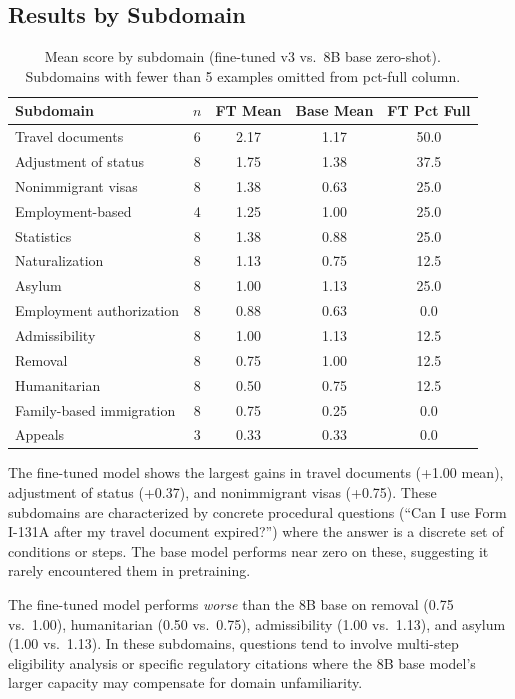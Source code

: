 \documentclass[11pt]{article}
\begin{document}
\subsection{Results by Subdomain}

\begin{table}[ht]
  \centering
  \caption{Mean score by subdomain (fine-tuned v3 vs.\ 8B base zero-shot). Subdomains with fewer than 5 examples omitted from pct-full column.}
  \label{tab:subdomain}
  \begin{tabular}{lcccc}
    \toprule
    Subdomain & $n$ & FT Mean & Base Mean & FT Pct Full \\
    \midrule
    Travel documents & 6 & 2.17 & 1.17 & 50.0 \\
    Adjustment of status & 8 & 1.75 & 1.38 & 37.5 \\
    Nonimmigrant visas & 8 & 1.38 & 0.63 & 25.0 \\
    Employment-based & 4 & 1.25 & 1.00 & 25.0 \\
    Statistics & 8 & 1.38 & 0.88 & 25.0 \\
    Naturalization & 8 & 1.13 & 0.75 & 12.5 \\
    Asylum & 8 & 1.00 & 1.13 & 25.0 \\
    Employment authorization & 8 & 0.88 & 0.63 & 0.0 \\
    Admissibility & 8 & 1.00 & 1.13 & 12.5 \\
    Removal & 8 & 0.75 & 1.00 & 12.5 \\
    Humanitarian & 8 & 0.50 & 0.75 & 12.5 \\
    Family-based immigration & 8 & 0.75 & 0.25 & 0.0 \\
    Appeals & 3 & 0.33 & 0.33 & 0.0 \\
    \bottomrule
  \end{tabular}
\end{table}

The fine-tuned model shows the largest gains in travel documents (+1.00 mean), adjustment of status (+0.37), and nonimmigrant visas (+0.75). These subdomains are characterized by concrete procedural questions (``Can I use Form I-131A after my travel document expired?'') where the answer is a discrete set of conditions or steps. The base model performs near zero on these, suggesting it rarely encountered them in pretraining.

The fine-tuned model performs \textit{worse} than the 8B base on removal (0.75 vs.\ 1.00), humanitarian (0.50 vs.\ 0.75), admissibility (1.00 vs.\ 1.13), and asylum (1.00 vs.\ 1.13). In these subdomains, questions tend to involve multi-step eligibility analysis or specific regulatory citations where the 8B base model's larger capacity may compensate for domain unfamiliarity.
\end{document}
